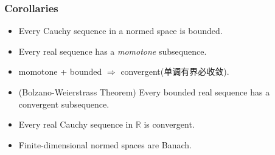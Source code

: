 \documentclass[
	border={25mm 20mm 25mm 30mm},  %
	varwidth,  %
	utf8,
]{standalone}
\begin{document}
\subsubsection{Corollaries}

\begin{itemize}
	\item Every Cauchy sequence in a normed space is bounded.
	\item Every real sequence has a \textit{momotone} subsequence.
	\item momotone + bounded \(\Longrightarrow\) convergent(单调有界必收敛).
	\item (Bolzano-Weierstrass Theorem) Every bounded real sequence has a convergent subsequence.
	\item Every real Cauchy sequence in \(\mathbb{R}\) is convergent. 
	\item Finite-dimensional normed spaces are Banach.
\end{itemize}
\end{document}
